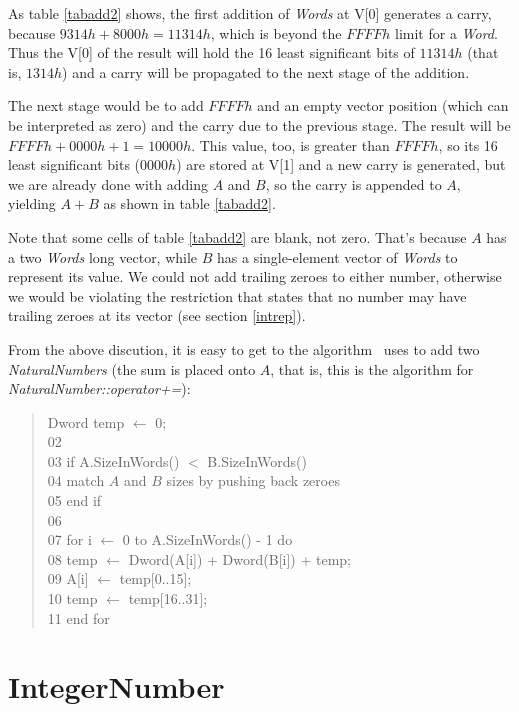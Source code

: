 \documentclass[a4paper,draft,12pt]{book}
\begin{document}
As table \ref{tabadd2} shows, the first addition of \emph{Words} at V[0]
generates a carry, because $9314h + 8000h = 11314h$, which is beyond the
$FFFFh$ limit for a \emph{Word}. Thus the V[0] of the result will hold the
16 least significant bits of $11314h$ (that is, $1314h$) and a carry will be
propagated to the next stage of the addition.

The next stage would be to add $FFFFh$ and an empty vector position
(which can be interpreted as zero) and the carry due to the previous stage.
The result will be $FFFFh + 0000h + 1 = 10000h$. This value, too, is greater
than $FFFFh$, so its 16 least significant bits ($0000h$) are stored at V[1] and
a new carry is generated, but we are already done with adding $A$ and $B$, so
the carry is appended to $A$, yielding $A + B$ as shown in table \ref{tabadd2}.

Note that some cells of table \ref{tabadd2} are blank, not zero. That's because
$A$ has a two \emph{Words} long vector, while $B$ has a single-element vector of
\emph{Words} to represent its value. We could not add trailing zeroes to either
number, otherwise we would be violating the restriction that states that no
number may have trailing zeroes at its vector (see section \ref{intrep}).

From the above discution, it is easy to get to the algorithm \popasm\ uses to
add two \emph{NaturalNumbers} (the sum is placed onto $A$, that is, this is
the algorithm for \emph{NaturalNumber::operator+=}):

\begin{quotation}
 Dword temp $\leftarrow$ 0;\\
02 \noindent \\
03 \noindent if A.SizeInWords() $<$ B.SizeInWords()\\
04 \indent   match $A$ and $B$ sizes by pushing back zeroes\\
05 \noindent end if\\
06 \noindent \\
07 \noindent for i $\leftarrow$ 0 to A.SizeInWords() - 1 do\\
08 \indent   temp $\leftarrow$ Dword(A[i]) + Dword(B[i]) + temp;\\
09 \indent   A[i] $\leftarrow$ temp[0..15];\\
10 \indent   temp $\leftarrow$ temp[16..31];\\
11 \noindent end for
\end{quotation}


\section{IntegerNumber}
\end{document}
